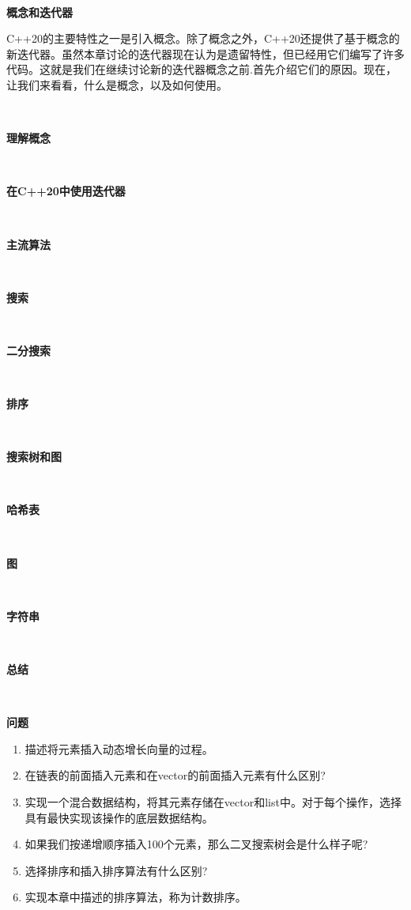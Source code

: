 \noindent\textbf{}\ \par
\textbf{概念和迭代器} \ \par
C++20的主要特性之一是引入概念。除了概念之外，C++20还提供了基于概念的新迭代器。虽然本章讨论的迭代器现在认为是遗留特性，但已经用它们编写了许多代码。这就是我们在继续讨论新的迭代器概念之前.首先介绍它们的原因。现在，让我们来看看，什么是概念，以及如何使用。 \par

\noindent\textbf{}\ \par
\textbf{理解概念} \ \par

\noindent\textbf{}\ \par
\textbf{在C++20中使用迭代器} \ \par

\noindent\textbf{}\ \par
\textbf{主流算法} \ \par

\noindent\textbf{}\ \par
\textbf{搜索} \ \par

\noindent\textbf{}\ \par
\textbf{二分搜索} \ \par

\noindent\textbf{}\ \par
\textbf{排序} \ \par

\noindent\textbf{}\ \par
\textbf{搜索树和图} \ \par

\noindent\textbf{}\ \par
\textbf{哈希表} \ \par

\noindent\textbf{}\ \par
\textbf{图} \ \par

\noindent\textbf{}\ \par
\textbf{字符串} \ \par

\noindent\textbf{}\ \par
\textbf{总结} \ \par

\noindent\textbf{}\ \par
\textbf{问题} \ \par
\begin{enumerate}
	\item 描述将元素插入动态增长向量的过程。
	\item 在链表的前面插入元素和在vector的前面插入元素有什么区别?
	\item 实现一个混合数据结构，将其元素存储在vector和list中。对于每个操作，选择具有最快实现该操作的底层数据结构。
	\item 如果我们按递增顺序插入100个元素，那么二叉搜索树会是什么样子呢?
	\item 选择排序和插入排序算法有什么区别?
	\item 实现本章中描述的排序算法，称为计数排序。
\end{enumerate}

